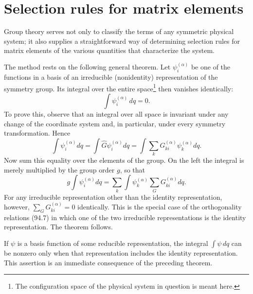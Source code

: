 \section{Selection rules for matrix elements}

Group theory serves not only to classify the terms of any symmetric physical
system; it also supplies a straightforward way of determining selection rules
for matrix elements of the various quantities that characterize the system.

The method rests on the following general theorem. Let
$\psi_i^{(\alpha)}$ be one of the functions in a basis of an irreducible
(nonidentity) representation of the symmetry group. Its integral over the
entire space\footnote{The configuration space of the physical system in
question is meant here.} then vanishes identically:
\begin{equation}
 \int \psi_i^{(\alpha)}\,dq=0.
 \tag{97.1}
\end{equation}
To prove this, observe that an integral over all space is invariant under any
change of the coordinate system and, in particular,
under every symmetry transformation. Hence
\[
 \int\psi_i^{(\alpha)}dq=\int\widehat G\psi_i^{(\alpha)}dq
 =\int\sum_k G_{ki}^{(\alpha)}\psi_k^{(\alpha)}dq.
\]
Now sum this equality over the elements of the group. On the left the integral
is merely multiplied by the group order $g$, so that
\[
 g\int\psi_i^{(\alpha)}dq=\sum_k\int\psi_k^{(\alpha)}\sum_G G_{ki}^{(\alpha)}dq.
\]
For any irreducible representation other than the identity representation,
however, $\sum_GG_{ki}^{(\alpha)}=0$ identically. This is the special case of
the orthogonality relations (94.7) in which one of the two irreducible
representations is the identity representation. The theorem follows.

If $\psi$ is a basis function of some reducible representation, the integral
$\int\psi\,dq$ can be nonzero only when that representation includes the
identity representation. This assertion is an immediate consequence of the
preceding theorem.

